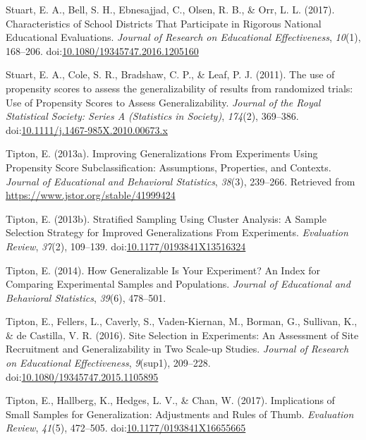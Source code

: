 \documentclass[man,floatsintext]{apa6}
\theoremstyle{definition}
\theoremstyle{definition}
\theoremstyle{definition}
\theoremstyle{remark}
\begin{document}
\leavevmode\hypertarget{ref-stuartCharacteristicsSchoolDistricts2017}{}%
Stuart, E. A., Bell, S. H., Ebnesajjad, C., Olsen, R. B., \& Orr, L. L.
(2017). Characteristics of School Districts That Participate in Rigorous
National Educational Evaluations. \emph{Journal of Research on
Educational Effectiveness}, \emph{10}(1), 168--206.
doi:\href{https://doi.org/10.1080/19345747.2016.1205160}{10.1080/19345747.2016.1205160}

\leavevmode\hypertarget{ref-stuartUsePropensityScores2011}{}%
Stuart, E. A., Cole, S. R., Bradshaw, C. P., \& Leaf, P. J. (2011). The
use of propensity scores to assess the generalizability of results from
randomized trials: Use of Propensity Scores to Assess Generalizability.
\emph{Journal of the Royal Statistical Society: Series A (Statistics in
Society)}, \emph{174}(2), 369--386.
doi:\href{https://doi.org/10.1111/j.1467-985X.2010.00673.x}{10.1111/j.1467-985X.2010.00673.x}

\leavevmode\hypertarget{ref-tiptonImprovingGeneralizationsExperiments2013}{}%
Tipton, E. (2013a). Improving Generalizations From Experiments Using
Propensity Score Subclassification: Assumptions, Properties, and
Contexts. \emph{Journal of Educational and Behavioral Statistics},
\emph{38}(3), 239--266. Retrieved from
\url{https://www.jstor.org/stable/41999424}

\leavevmode\hypertarget{ref-tiptonStratifiedSamplingUsing2013}{}%
Tipton, E. (2013b). Stratified Sampling Using Cluster Analysis: A Sample
Selection Strategy for Improved Generalizations From Experiments.
\emph{Evaluation Review}, \emph{37}(2), 109--139.
doi:\href{https://doi.org/10.1177/0193841X13516324}{10.1177/0193841X13516324}

\leavevmode\hypertarget{ref-tiptonHowGeneralizableYour2014}{}%
Tipton, E. (2014). How Generalizable Is Your Experiment? An Index for
Comparing Experimental Samples and Populations. \emph{Journal of
Educational and Behavioral Statistics}, \emph{39}(6), 478--501.

\leavevmode\hypertarget{ref-tiptonSiteSelectionExperiments2016}{}%
Tipton, E., Fellers, L., Caverly, S., Vaden-Kiernan, M., Borman, G.,
Sullivan, K., \& de Castilla, V. R. (2016). Site Selection in
Experiments: An Assessment of Site Recruitment and Generalizability in
Two Scale-up Studies. \emph{Journal of Research on Educational
Effectiveness}, \emph{9}(sup1), 209--228.
doi:\href{https://doi.org/10.1080/19345747.2015.1105895}{10.1080/19345747.2015.1105895}

\leavevmode\hypertarget{ref-tiptonImplicationsSmallSamples2017}{}%
Tipton, E., Hallberg, K., Hedges, L. V., \& Chan, W. (2017).
Implications of Small Samples for Generalization: Adjustments and Rules
of Thumb. \emph{Evaluation Review}, \emph{41}(5), 472--505.
doi:\href{https://doi.org/10.1177/0193841X16655665}{10.1177/0193841X16655665}

\endgroup
\end{document}
